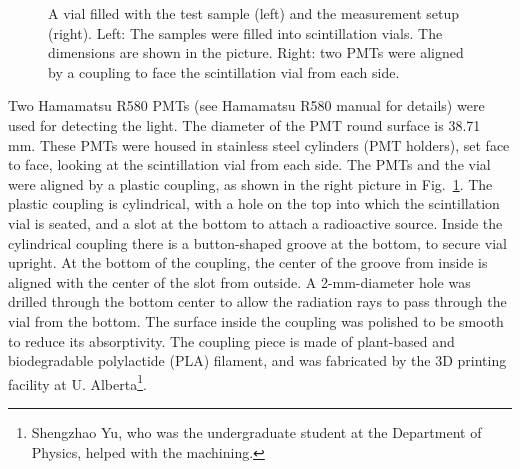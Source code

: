 \begin{figure}[htbp]
	\caption[A vial filled with the test sample and the measurement setup.]{A vial filled with the test sample (left) and the measurement setup (right). Left: The samples were filled into scintillation vials. The dimensions are shown in the picture. Right: two PMTs were aligned by a coupling to face the scintillation vial from each side.\label{scintVial}}
\end{figure}

Two Hamamatsu R580 PMTs (see Hamamatsu R580 manual\cite{pmtR580} for details) were used for detecting the light. The diameter of the PMT round surface is 38.71 mm. These PMTs were housed in stainless steel cylinders (PMT holders), set face to face, looking at the scintillation vial from each side. The PMTs and the vial were aligned by a plastic coupling, as shown in the right picture in Fig.~\ref{scintVial}. The plastic coupling is cylindrical, with a hole on the top into which the scintillation vial is seated, and a slot at the bottom to attach a radioactive source. Inside the cylindrical coupling there is a button-shaped groove at the bottom, to secure vial upright. At the bottom of the coupling, the center of the groove from inside is aligned with the center of the slot from outside. A 2-mm-diameter hole was drilled through the bottom center to allow the radiation rays to pass through the vial from the bottom. The surface inside the coupling was polished to be smooth to reduce its absorptivity. The coupling piece is made of plant-based and biodegradable polylactide (PLA) filament, and was fabricated by the 3D printing facility at U. Alberta\footnote{Shengzhao Yu, who was the undergraduate student at the Department of Physics, helped with the machining.}.

